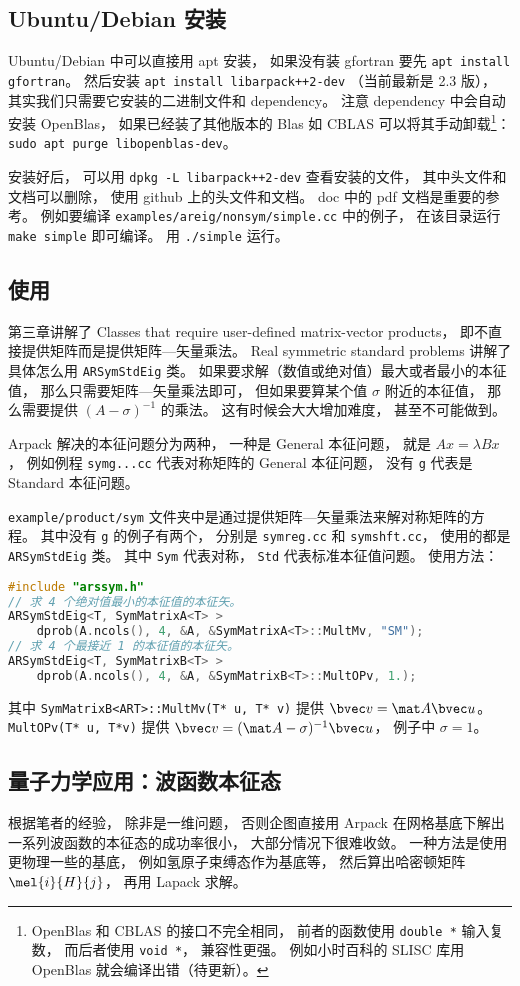 \subsection{Ubuntu/Debian 安装}
Ubuntu/Debian 中可以直接用 apt 安装， 如果没有装 gfortran 要先 \verb|apt install gfortran|。 然后安装 \verb|apt install libarpack++2-dev| （当前最新是 2.3 版）， 其实我们只需要它安装的二进制文件和 dependency。 注意 dependency 中会自动安装 OpenBlas， 如果已经装了其他版本的 Blas 如 CBLAS 可以将其手动卸载\footnote{OpenBlas 和 CBLAS 的接口不完全相同， 前者的函数使用 \lstinline|double *| 输入复数， 而后者使用 \lstinline|void *|， 兼容性更强。 例如小时百科的 SLISC 库用 OpenBlas 就会编译出错（待更新）。}： \verb|sudo apt purge libopenblas-dev|。

安装好后， 可以用 \verb|dpkg -L libarpack++2-dev| 查看安装的文件， 其中头文件和文档可以删除， 使用 github 上的头文件和文档。 doc 中的 pdf 文档是重要的参考。 例如要编译 \verb|examples/areig/nonsym/simple.cc| 中的例子， 在该目录运行 \verb|make simple| 即可编译。 用 \verb|./simple| 运行。

\subsection{使用}
第三章讲解了 Classes that require user-defined matrix-vector products， 即不直接提供矩阵而是提供矩阵—矢量乘法。 Real symmetric standard problems 讲解了具体怎么用 \verb|ARSymStdEig| 类。 如果要求解（数值或绝对值）最大或者最小的本征值， 那么只需要矩阵—矢量乘法即可， 但如果要算某个值 $\sigma$ 附近的本征值， 那么需要提供 $(A - \sigma)^{-1}$ 的乘法。 这有时候会大大增加难度， 甚至不可能做到。

Arpack 解决的本征问题分为两种， 一种是 General 本征问题， 就是 $Ax = \lambda Bx$， 例如例程 \verb|symg...cc| 代表对称矩阵的 General 本征问题， 没有 \verb|g| 代表是 Standard 本征问题。

\verb|example/product/sym| 文件夹中是通过提供矩阵—矢量乘法来解对称矩阵的方程。 其中没有 \verb|g| 的例子有两个， 分别是 \verb|symreg.cc| 和 \verb|symshft.cc|， 使用的都是 \verb|ARSymStdEig| 类。 其中 \verb|Sym| 代表对称， \verb|Std| 代表标准本征值问题。 使用方法：
\begin{lstlisting}[language=cpp]
#include "arssym.h"
// 求 4 个绝对值最小的本征值的本征矢。
ARSymStdEig<T, SymMatrixA<T> >
    dprob(A.ncols(), 4, &A, &SymMatrixA<T>::MultMv, "SM");
// 求 4 个最接近 1 的本征值的本征矢。
ARSymStdEig<T, SymMatrixB<T> >
    dprob(A.ncols(), 4, &A, &SymMatrixB<T>::MultOPv, 1.);
\end{lstlisting}
其中 \verb|SymMatrixB<ART>::MultMv(T* u, T* v)| 提供 $\bvec v = \mat A\bvec u$。 \verb|MultOPv(T* u, T*v)| 提供 $\bvec v = (\mat A - \sigma)^{-1}\bvec u$， 例子中 $\sigma = 1$。

\subsection{量子力学应用：波函数本征态}
根据笔者的经验， 除非是一维问题， 否则企图直接用 Arpack 在网格基底下解出一系列波函数的本征态的成功率很小， 大部分情况下很难收敛。 一种方法是使用更物理一些的基底， 例如氢原子束缚态作为基底等， 然后算出哈密顿矩阵 $\mel{i}{H}{j}$， 再用 Lapack 求解。
